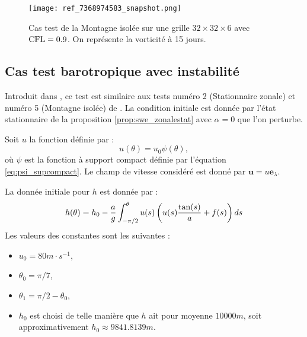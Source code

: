 \begin{figure}[htbp]
\begin{center}
\texttt{[image: ref\_7368974583\_snapshot.png]}
\end{center}
\caption{Cas test de la Montagne isolée \cite{Williamson1992} sur une grille $32 \times 32 \times 6$ avec $\text{CFL}=0.9$. On représente la vorticité à 15 jours.}
\label{fig: williamson 5 vorticité}
\end{figure}





















\subsection{Cas test barotropique avec instabilité}

Introduit dans \cite{Galewsky2004}, ce test est similaire aux tests numéro 2 (Stationnaire zonale) et numéro 5 (Montagne isolée) de \cite{Williamson1992}. La condition initiale est donnée par l'état stationnaire de la proposition \ref{prop:swe_zonalestat} avec $\alpha=0$ que l'on perturbe.

Soit $u$ la fonction définie par :
\begin{equation}
u(\theta) = u_{0} \psi(\theta),
\end{equation}
où $\psi$ est la fonction à support compact définie par l'équation \eqref{eq:psi_supcompact}. Le champ de vitesse considéré est donné par $\mathbf{u} = u \mathbf{e}_{\lambda}$.

La donnée initiale pour $h$ est donnée par :
\begin{equation}
h(\theta) = h_0 - \dfrac{a}{g} \displaystyle\int^{\theta}_{-\pi/2} u(s) \left( u(s) \dfrac{\tan (s)}{a} + f(s) \right) ds
\end{equation}
Les valeurs des constantes sont les suivantes :
\begin{itemize}
\item $u_{0}=80 \si{m} \cdot  \si{s^{-1}}$,
\item $\theta_0 = \pi/7$,
\item $\theta_1 = \pi/2 - \theta_0$,
\item $h_0$ est choisi de telle manière que $h$ ait pour moyenne $10000 \si{m}$, soit approximativement $h_0 \approx 9841.8139 \si{m}$.
\end{itemize}

